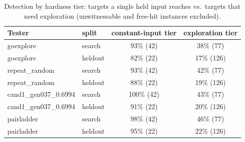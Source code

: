 \begin{table}[t]\centering\small
\begin{tabular}{llcc}
\toprule
Tester & split & constant-input tier & exploration tier \\
\midrule
goexplore & search & 93\% (42) & 38\% (77) \\
goexplore & heldout & 82\% (22) & 17\% (126) \\
repeat\_random & search & 93\% (42) & 42\% (77) \\
repeat\_random & heldout & 88\% (22) & 19\% (126) \\
cand1\_gen037\_0.6994 & search & 100\% (42) & 43\% (77) \\
cand1\_gen037\_0.6994 & heldout & 91\% (22) & 20\% (126) \\
pairladder & search & 98\% (42) & 46\% (77) \\
pairladder & heldout & 95\% (22) & 22\% (126) \\
\bottomrule
\end{tabular}
\caption{Detection by hardness tier: targets a single held input reaches vs.\ targets that need exploration (unwitnessable and free-hit instances excluded).}
\label{tab:tiers}
\end{table}
